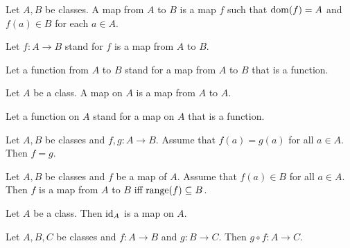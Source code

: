 \documentclass[10pt]{article}
\begin{document}
  \begin{forthel}
    \begin{definition}[id=FOUNDATIONS_06_2823507398361088,printid]
      Let $A, B$ be classes.
      A map from $A$ to $B$ is a map $f$ such that $\operatorname{dom}(f) = A$ and $f(a) \in B$ for each $a \in A$.
    \end{definition}

    Let $f: A \to B$ stand for $f$ is a map from $A$ to $B$.

    Let a function from $A$ to $B$ stand for a map from $A$ to $B$ that is a function.
  \end{forthel}

  \begin{forthel}
    \begin{definition}[id=FOUNDATIONS_06_3390734908522496,printid]
      Let $A$ be a class.
      A map on $A$ is a map from $A$ to $A$.
    \end{definition}

    Let a function on $A$ stand for a map on $A$ that is a function.
  \end{forthel}

  \begin{forthel}
    \begin{proposition}[id=FOUNDATIONS_06_3312973569327104,printid]
      Let $A, B$ be classes and $f, g : A \to B$.
      Assume that $f(a) = g(a)$ for all $a \in A$.
      Then $f = g$.
    \end{proposition}
  \end{forthel}

  \begin{forthel}
    \begin{proposition}
      Let $A, B$ be classes and $f$ be a map of $A$.
      Assume that $f(a) \in B$ for all $a \in A$.
      Then $f$ is a map from $A$ to $B$ iff $\textrm{range}(f) \subseteq B$.
    \end{proposition}
  \end{forthel}

  \begin{forthel}
    \begin{proposition}[id=FOUNDATIONS_06_5104361690628096,printid]
      Let $A$ be a class.
      Then $\textrm{id}_{A}$ is a map on $A$.
    \end{proposition}
  \end{forthel}

  \begin{forthel}
    \begin{proposition}[id=FOUNDATIONS_06_1706446651654144,printid]
      Let $A, B, C$ be classes and $f : A \to B$ and $g : B \to C$.
      Then $g \circ f : A \to C$.
    \end{proposition}
  \end{forthel}
\end{document}
